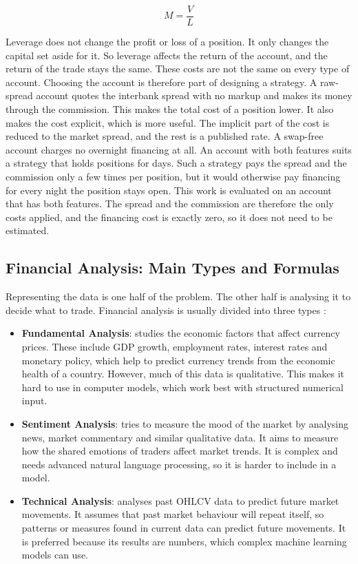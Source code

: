 \begin{equation}
M = \frac{V}{L}
\end{equation}

Leverage does not change the profit or loss of a position. It only changes the capital set aside for it. So leverage affects the return of the account, and the return of the trade stays the same. These costs are not the same on every type of account. Choosing the account is therefore part of designing a strategy. A raw-spread account quotes the interbank spread with no markup and makes its money through the commission. This makes the total cost of a position lower. It also makes the cost explicit, which is more useful. The implicit part of the cost is reduced to the market spread, and the rest is a published rate. A swap-free account charges no overnight financing at all. An account with both features suits a strategy that holds positions for days. Such a strategy pays the spread and the commission only a few times per position, but it would otherwise pay financing for every night the position stays open. This work is evaluated on an account that has both features. The spread and the commission are therefore the only costs applied, and the financing cost is exactly zero, so it does not need to be estimated.

\subsection{Financial Analysis: Main Types and Formulas}

Representing the data is one half of the problem. The other half is analysing it to decide what to trade. Financial analysis is usually divided into three types \cite{lim_handbook_2015}:

\begin{itemize}
\item \textbf{Fundamental Analysis}: studies the economic factors that affect currency prices. These include GDP growth, employment rates, interest rates and monetary policy, which help to predict currency trends from the economic health of a country. However, much of this data is qualitative. This makes it hard to use in computer models, which work best with structured numerical input.
\item \textbf{Sentiment Analysis}: tries to measure the mood of the market by analysing news, market commentary and similar qualitative data. It aims to measure how the shared emotions of traders affect market trends. It is complex and needs advanced natural language processing, so it is harder to include in a model.
\item \textbf{Technical Analysis}: analyses past OHLCV data to predict future market movements. It assumes that past market behaviour will repeat itself, so patterns or measures found in current data can predict future movements. It is preferred because its results are numbers, which complex machine learning models can use.
\end{itemize}

